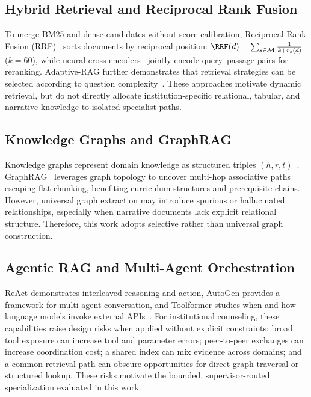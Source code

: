\subsection{Hybrid Retrieval and Reciprocal Rank Fusion}
\label{sec:hybrid_rrf}

To merge BM25 and dense candidates without score calibration, Reciprocal Rank Fusion (RRF)~\cite{cormack2009rrf} sorts documents by reciprocal position: $\RRF(d) = \sum_{s \in \mathcal{M}} \frac{1}{k + r_s(d)}$ ($k = 60$), while neural cross-encoders~\cite{nogueira2019bert,xiao2023bge} jointly encode query--passage pairs for reranking. Adaptive-RAG further demonstrates that retrieval strategies can be selected according to question complexity~\cite{jeong2024adaptiverag}. These approaches motivate dynamic retrieval, but do not directly allocate institution-specific relational, tabular, and narrative knowledge to isolated specialist paths.

\subsection{Knowledge Graphs and GraphRAG}
\label{sec:kg_graphrag}

Knowledge graphs represent domain knowledge as structured triples $(h, r, t)$~\cite{pan2024unifying}. GraphRAG~\cite{edge2024graphrag} leverages graph topology to uncover multi-hop associative paths escaping flat chunking, benefiting curriculum structures and prerequisite chains. However, universal graph extraction may introduce spurious or hallucinated relationships, especially when narrative documents lack explicit relational structure. Therefore, this work adopts selective rather than universal graph construction.

\subsection{Agentic RAG and Multi-Agent Orchestration}
\label{sec:agentic_multiagent}

ReAct demonstrates interleaved reasoning and action, AutoGen provides a framework for multi-agent conversation, and Toolformer studies when and how language models invoke external APIs~\cite{yao2023react,wu2023autogen,schick2023toolformer}. For institutional counseling, these capabilities raise design risks when applied without explicit constraints: broad tool exposure can increase tool and parameter errors; peer-to-peer exchanges can increase coordination cost; a shared index can mix evidence across domains; and a common retrieval path can obscure opportunities for direct graph traversal or structured lookup. These risks motivate the bounded, supervisor-routed specialization evaluated in this work.

